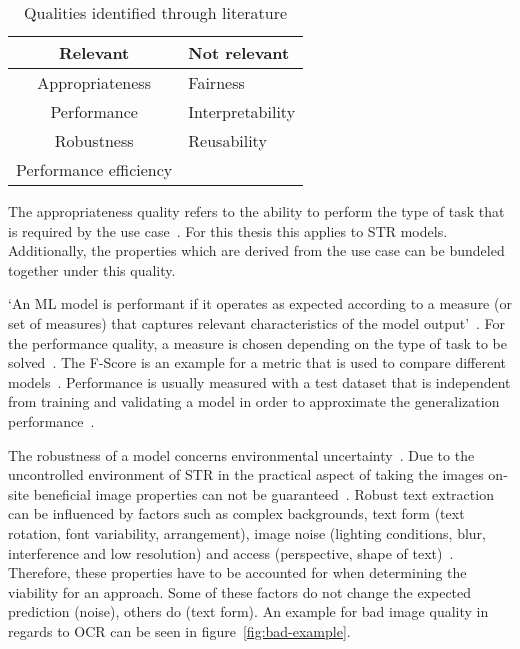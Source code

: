 \begin{table}[h]\label{tb:literatureQualities}
    \centering
    \begin{tabular}{c l}
        Relevant                & Not relevant \\
        \midrule
        Appropriateness         & Fairness  \\
        Performance             & Interpretability \\
        Robustness              & Reusability \\
        Performance efficiency  & \\
    \end{tabular}
    \caption{Qualities identified through literature}
\end{table}

The appropriateness quality refers to the ability to perform the type of task that is required by
the use case~\citep{siebert_construction_2021,nakamichi_requirements-driven_2020}.
For this thesis this applies to \ac{STR} models.
Additionally, the properties which are derived from the use case can be bundeled together under this
quality.

`An ML model is performant if it operates as expected according to a measure (or set of measures)
that captures relevant characteristics of the model output'~\citep{ashmore_assuring_2021}.
For the performance quality, a measure is chosen depending on the type of task to be
solved~\citep{siebert_construction_2021}.
The F-Score is an example for a metric that is used to compare different
models~\cite{chen_text_2021, long_scene_2021}.
Performance is usually measured with a test dataset that is independent from training and validating
a model in order to approximate the generalization performance~\cite{goodfellow_deep_2016,
nakamichi_requirements-driven_2020}.

The robustness of a model concerns environmental uncertainty~\cite{ashmore_assuring_2021}.
Due to the uncontrolled environment of \ac{STR} in the practical aspect of taking the images on-site
beneficial image properties can not be guaranteed~\citep{chen_text_2021}.
Robust text extraction can be influenced by factors such as complex backgrounds, text form
(text rotation, font variability, arrangement), image noise (lighting conditions, blur,
interference and low resolution) and access (perspective, shape of
text)~\citep{oyedotun_deep_2015,ghosh_visual_2017,chen_text_2021}.
Therefore, these properties have to be accounted for when determining the viability for an approach.
Some of these factors do not change the expected prediction (noise), others do (text
form)\cite{hu_towards_2020}.
An example for bad image quality in regards to \ac{OCR} can be seen in figure~\ref{fig:bad-example}.

